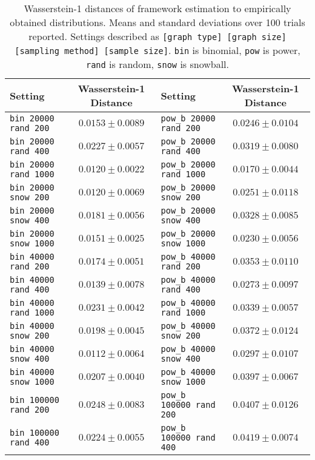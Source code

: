 \begin{table*}
\caption{Wasserstein-1 distances of framework estimation to empirically obtained distributions. Means and standard deviations over 100 trials reported. Settings described as \texttt{[graph type] [graph size] [sampling method] [sample size]}. \texttt{bin} is binomial, \texttt{pow} is power, \texttt{rand} is random, \texttt{snow} is snowball.}
\label{tab:distances}
\begin{tabular}{lc|lc}
\toprule
Setting & Wasserstein-1 Distance & Setting & Wasserstein-1 Distance\\
\midrule
\texttt{bin 20000 rand 200} & $0.0153 \pm 0.0089$ & \texttt{pow\_b 20000 rand 200} & $0.0246 \pm 0.0104$ \\
\texttt{bin 20000 rand 400} & $0.0227 \pm 0.0057$ & \texttt{pow\_b 20000 rand 400} & $0.0319 \pm 0.0080$ \\
\texttt{bin 20000 rand 1000} & $0.0120 \pm 0.0022$ & \texttt{pow\_b 20000 rand 1000} & $0.0170 \pm 0.0044$ \\
\texttt{bin 20000 snow 200} & $0.0120 \pm 0.0069$ & \texttt{pow\_b 20000 snow 200} & $0.0251 \pm 0.0118$ \\
\texttt{bin 20000 snow 400} & $0.0181 \pm 0.0056$ & \texttt{pow\_b 20000 snow 400} & $0.0328 \pm 0.0085$ \\
\texttt{bin 20000 snow 1000} & $0.0151 \pm 0.0025$ & \texttt{pow\_b 20000 snow 1000} & $0.0230 \pm 0.0056$ \\
\texttt{bin 40000 rand 200} & $0.0174 \pm 0.0051$ & \texttt{pow\_b 40000 rand 200} & $0.0353 \pm 0.0110$ \\
\texttt{bin 40000 rand 400} & $0.0139 \pm 0.0078$ & \texttt{pow\_b 40000 rand 400} & $0.0273 \pm 0.0097$ \\
\texttt{bin 40000 rand 1000} & $0.0231 \pm 0.0042$ & \texttt{pow\_b 40000 rand 1000} & $0.0339 \pm 0.0057$ \\
\texttt{bin 40000 snow 200} & $0.0198 \pm 0.0045$ & \texttt{pow\_b 40000 snow 200} & $0.0372 \pm 0.0124$ \\
\texttt{bin 40000 snow 400} & $0.0112 \pm 0.0064$ & \texttt{pow\_b 40000 snow 400} & $0.0297 \pm 0.0107$ \\
\texttt{bin 40000 snow 1000} & $0.0207 \pm 0.0040$ & \texttt{pow\_b 40000 snow 1000} & $0.0397 \pm 0.0067$ \\
\texttt{bin 100000 rand 200} & $0.0248 \pm 0.0083$ & \texttt{pow\_b 100000 rand 200} & $0.0407 \pm 0.0126$ \\
\texttt{bin 100000 rand 400} & $0.0224 \pm 0.0055$ & \texttt{pow\_b 100000 rand 400} & $0.0419 \pm 0.0074$ \\

\end{tabular}
\end{table*}
